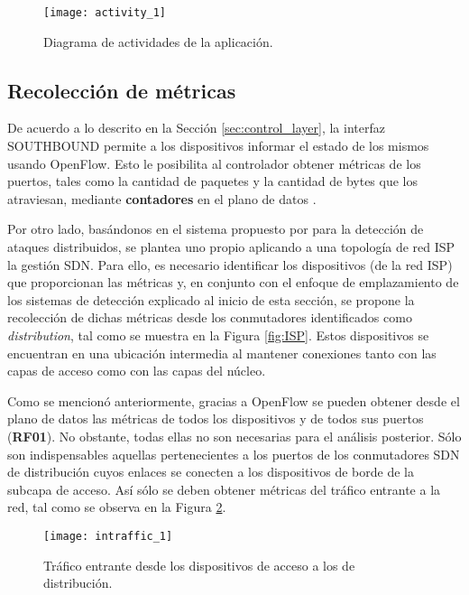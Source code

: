 \begin{figure}[H]
	\centering 
	\texttt{[image: activity\_1]}
	\caption{Diagrama de actividades de la aplicación.}
	\label{fig:diagram1}
\end{figure}

\subsection{Recolección de métricas}

De acuerdo a lo descrito en la Sección \ref{sec:control_layer}, la interfaz
SOUTHBOUND permite a los dispositivos informar el estado de los mismos usando
OpenFlow. Esto le posibilita al controlador obtener métricas de los puertos,
tales como la cantidad de paquetes y la cantidad de bytes que los atraviesan,
mediante \textbf{contadores} en el plano de datos \parencite{opf151}.

Por otro lado, basándonos en el sistema propuesto por \parencite{estado_arte_2}
para la detección de ataques distribuidos, se plantea uno propio aplicando a una
topología de red ISP la gestión SDN. Para ello, es necesario identificar los
dispositivos (de la red ISP) que proporcionan las métricas y, en conjunto con el
enfoque de emplazamiento de los sistemas de detección explicado al inicio de
esta sección, se propone la recolección de dichas métricas desde los conmutadores
identificados como \textit{distribution}, tal como se muestra en la Figura
\ref{fig:ISP}. Estos dispositivos se encuentran en una ubicación intermedia al
mantener conexiones tanto con las capas de acceso como con las capas del núcleo.

Como se mencionó anteriormente, gracias a OpenFlow se pueden obtener desde el
plano de datos las métricas de todos los dispositivos y de todos sus puertos
(\textbf{RF01}). No obstante, todas ellas no son necesarias para el análisis
posterior. Sólo son indispensables aquellas pertenecientes a los puertos de los
conmutadores SDN de distribución cuyos enlaces se conecten a los dispositivos de
borde de la subcapa de acceso. Así sólo se deben obtener métricas del tráfico
entrante a la red, tal como se observa en la Figura \ref{fig:trafico_entrante}.


\begin{figure}[H]
	\centering 
	\texttt{[image: intraffic\_1]}
	\caption{Tráfico entrante desde los dispositivos de acceso a los de
    distribución.}
	\label{fig:trafico_entrante}
\end{figure}



